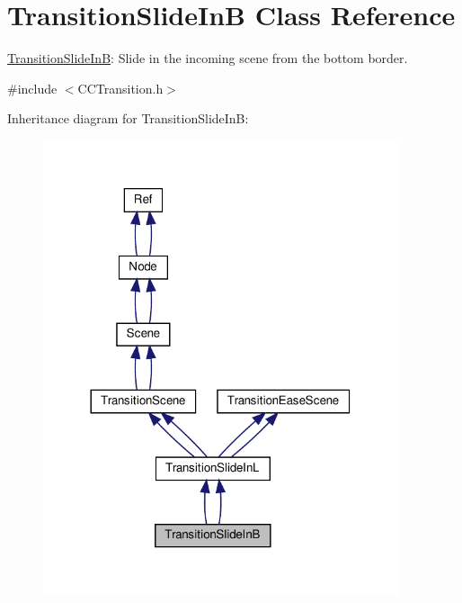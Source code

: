 \hypertarget{classTransitionSlideInB}{}\section{Transition\+Slide\+InB Class Reference}
\label{classTransitionSlideInB}


\hyperlink{classTransitionSlideInB}{Transition\+Slide\+InB}\+: Slide in the incoming scene from the bottom border.  




{\ttfamily \#include $<$C\+C\+Transition.\+h$>$}



Inheritance diagram for Transition\+Slide\+InB\+:
\nopagebreak
\begin{figure}[H]
\begin{center}
\leavevmode
\includegraphics[width=296pt]{classTransitionSlideInB__inherit__graph}
\end{center}
\end{figure}


